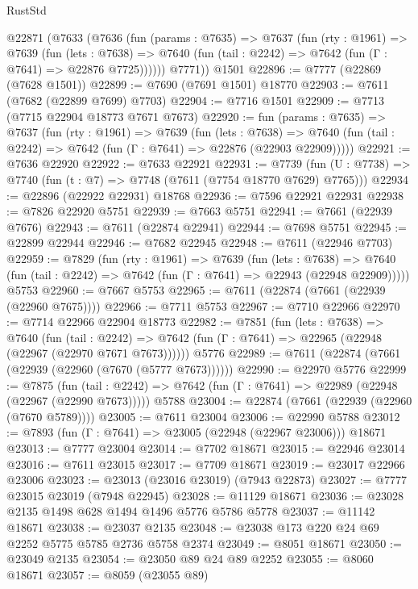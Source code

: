 \begin{lexlean}{RustStd}
\begin{coremodule}
{\begin{coremodule}
{{{{{{{{{{{{{{{{{{{{{{{{{{{{{{{{{{    @22871
      (@7633
        (@7636
          (fun (params : @7635) =>
          @7637
            (fun (rty : @1961) =>
            @7639
              (fun (lets : @7638) =>
              @7640 (fun (tail : @2242) => @7642 (fun (Γ : @7641) => @22876 @7725))))))
        @7771))
    @1501
@22896 := @7777 (@22869 (@7628 @1501))
@22899 := @7690 (@7691 @1501) @18770
@22903 := @7611 (@7682 (@22899 @7699) @7703)
@22904 := @7716 @1501
@22909 := @7713 (@7715 @22904 @18773 @7671 @7673)
@22920 := fun (params : @7635) =>
  @7637
    (fun (rty : @1961) =>
    @7639
      (fun (lets : @7638) =>
      @7640 (fun (tail : @2242) => @7642 (fun (Γ : @7641) => @22876 (@22903 @22909)))))
@22921 := @7636 @22920
@22922 := @7633 @22921
@22931 := @7739
    (fun (U : @7738) => @7740 (fun (t : @7) => @7748 (@7611 (@7754 @18770 @7629) @7765)))
@22934 := @22896 (@22922 @22931) @18768
@22936 := @7596 @22921 @22931
@22938 := @7826 @22920 @5751
@22939 := @7663 @5751
@22941 := @7661 (@22939 @7676)
@22943 := @7611 (@22874 @22941)
@22944 := @7698 @5751
@22945 := @22899 @22944
@22946 := @7682 @22945
@22948 := @7611 (@22946 @7703)
@22959 := @7829
    (fun (rty : @1961) =>
    @7639
      (fun (lets : @7638) =>
      @7640 (fun (tail : @2242) => @7642 (fun (Γ : @7641) => @22943 (@22948 @22909)))))
    @5753
@22960 := @7667 @5753
@22965 := @7611 (@22874 (@7661 (@22939 (@22960 @7675))))
@22966 := @7711 @5753
@22967 := @7710 @22966
@22970 := @7714 @22966 @22904 @18773
@22982 := @7851
    (fun (lets : @7638) =>
    @7640
      (fun (tail : @2242) =>
      @7642 (fun (Γ : @7641) => @22965 (@22948 (@22967 (@22970 @7671 @7673))))))
    @5776
@22989 := @7611 (@22874 (@7661 (@22939 (@22960 (@7670 (@5777 @7673))))))
@22990 := @22970 @5776
@22999 := @7875
    (fun (tail : @2242) => @7642 (fun (Γ : @7641) => @22989 (@22948 (@22967 (@22990 @7673)))))
    @5788
@23004 := @22874 (@7661 (@22939 (@22960 (@7670 @5789))))
@23005 := @7611 @23004
@23006 := @22990 @5788
@23012 := @7893 (fun (Γ : @7641) => @23005 (@22948 (@22967 @23006))) @18671
@23013 := @7777 @23004
@23014 := @7702 @18671
@23015 := @22946 @23014
@23016 := @7611 @23015
@23017 := @7709 @18671
@23019 := @23017 @22966 @23006
@23023 := @23013 (@23016 @23019) (@7943 @22873)
@23027 := @7777 @23015 @23019 (@7948 @22945)
@23028 := @11129 @18671
@23036 := @23028 @2135 @1498 @628 @1494 @1496 @5776 @5786 @5778
@23037 := @11142 @18671
@23038 := @23037 @2135
@23048 := @23038 @173 @220 @24 @69 @2252 @5775 @5785 @2736 @5758 @2374
@23049 := @8051 @18671
@23050 := @23049 @2135
@23054 := @23050 @89 @24 @89 @2252
@23055 := @8060 @18671
@23057 := @8059 (@23055 @89)
}}}}}}}}}}}}}}}}}}}}}}}}}}}}}}}}}}
\end{coremodule}}
\end{coremodule}
\end{lexlean}

